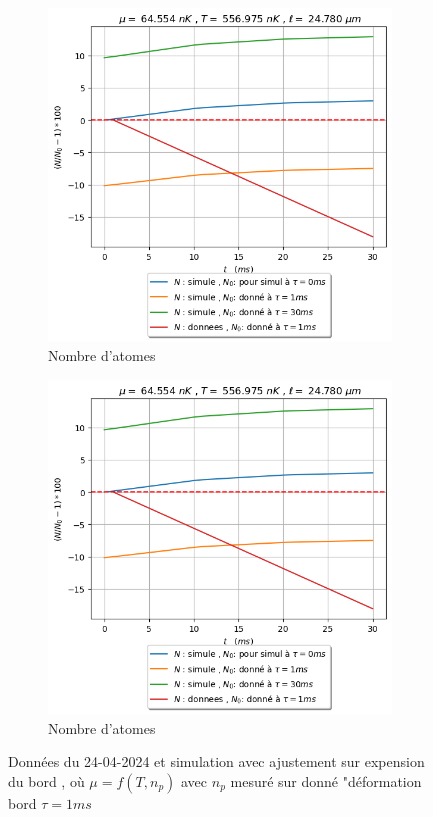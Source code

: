 \documentclass[a3, 10pt,twoside]{article}          %
\theoremstyle{plain}
\theoremstyle{definition}
\theoremstyle{remark}
\theoremstyle{definition} %
\begin{document}
\begin{figure}[ht]
    \vspace{1em}
    \begin{subfigure}[b]{0.45\textwidth}
        \centering
        \includegraphics[width=\textwidth]{Figures/Nat}
        \caption{Nombre d'atomes}
        \label{fig:sub4}
    \end{subfigure}
    \begin{subfigure}[b]{0.45\textwidth}
        \centering
        \includegraphics[width=\textwidth]{Figures/Nat}
        \caption{Nombre d'atomes}
        \label{fig:sub3}
    \end{subfigure}
    
    

    \caption{Données du 24-04-2024 et simulation avec ajustement sur expension du bord , où $\mu = f(T , n_p)$ avec $n_p$ mesuré sur donné "déformation bord $\tau = 1ms$}
    \label{fig:main}
\end{figure}
	
\end{document}
